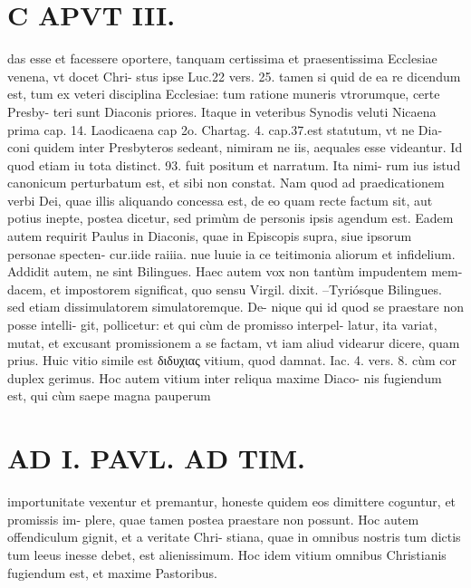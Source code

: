 \documentclass{article}
\begin{document}
\begin{pages}
\section*{C APVT III. }
\marginpar{[ p.153 ]}\pstart das esse et facessere oportere, tanquam certissima et praesentissima Ecclesiae venena, vt docet Chri- stus ipse Luc.22 vers. 25. tamen si quid de ea re dicendum est, tum ex veteri disciplina Ecclesiae: tum ratione muneris vtrorumque, certe Presby- teri sunt Diaconis priores. Itaque in veteribus Synodis veluti Nicaena prima cap. 14. Laodicaena cap 2o. Chartag. 4. cap.37.est statutum, vt ne Dia- coni quidem inter Presbyteros sedeant, nimiram ne iis, aequales esse videantur. Id quod etiam iu tota distinct. 93. fuit positum et narratum. Ita nimi- rum ius istud canonicum perturbatum est, et sibi non constat. Nam quod ad praedicationem verbi Dei, quae illis aliquando concessa est, de eo quam recte factum sit, aut potius inepte, postea dicetur, sed primùm de personis ipsis agendum est.  \pend\pstart Eadem autem requirit Paulus in Diaconis, quae in Episcopis supra, siue ipsorum personae specten- cur.iide raiiia. nue luuie ia ce teitimonia aliorum et infidelium. Addidit autem, ne sint Bilingues. Haec autem vox non tantùm impudentem mem- dacem, et impostorem significat, quo sensu Virgil. dixit.  \pend\pstart –Tyriósque Bilingues.  \pend\pstart sed etiam dissimulatorem simulatoremque. De- nique qui id quod se praestare non posse intelli- git, pollicetur: et qui cùm de promisso interpel- latur, ita variat, mutat, et excusant promissionem a se factam, vt iam aliud videarur dicere, quam prius. Huic vitio simile est διδυχιας vitium, quod damnat. Iac. 4. vers. 8. cùm cor duplex gerimus. Hoc autem vitium inter reliqua maxime Diaco- nis fugiendum est, qui cùm saepe magna pauperum  \pend
\section*{AD I. PAVL. AD TIM. }
\marginpar{[ p.160 ]}\pstart importunitate vexentur et premantur, honeste quidem eos dimittere coguntur, et promissis im- plere, quae tamen postea praestare non possunt. Hoc autem offendiculum gignit, et a veritate Chri- stiana, quae in omnibus nostris tum dictis tum leeus inesse debet, est alienissimum. Hoc idem vitium omnibus Christianis fugiendum est, et maxime Pastoribus.  \pend
{}
{}

\end{pages}
\end{document}
